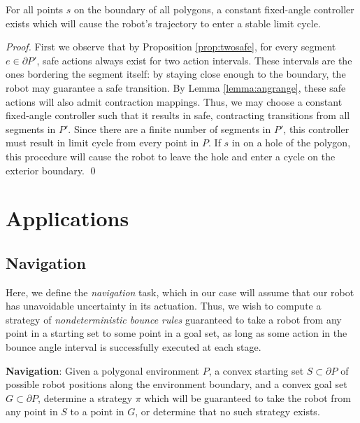 \documentclass[]{styles/svproc}  %
\begin{document}
\begin{proposition} \label{prop:cycle}
For all points $s$ on the boundary of all polygons, a constant
fixed-angle controller exists which will cause the robot's trajectory to enter a
stable limit cycle.
\end{proposition}

\begin{proof}
First we observe that by Proposition \ref{prop:twosafe}, for every segment $e
\in \partial P'$, 
safe actions always exist
for two action intervals. These intervals are the ones bordering the segment itself:
by staying close enough to the boundary, the robot may guarantee a safe
transition. By Lemma \ref{lemma:angrange}, these safe actions will also
admit contraction mappings. Thus, we may choose a constant fixed-angle
controller such that it results in safe, contracting transitions from all
segments in $P'$. Since there are a finite number of segments in $P'$, this
controller must result in limit cycle from every point in $P$. If $s$ in on a
hole of the polygon, this procedure will cause the robot to leave the hole and
enter a cycle on the exterior boundary. \qed
\end{proof}

\section{Applications}

\subsection{Navigation}

Here, we define the \emph{navigation} task, which in our case will assume that
our robot has unavoidable uncertainty in its actuation. Thus, we wish to compute 
a strategy of \emph{nondeterministic bounce rules} guaranteed to take a robot
from any point in a starting set to some point in a goal set, as long as some
action in the bounce angle interval is successfully executed at each stage. 

\begin{definition}
\textbf{Navigation}:
Given a polygonal environment $P$, a convex starting set $S \subset \partial P$ of possible robot positions along the
environment boundary, and a convex goal set $G \subset \partial P$, determine a strategy $\pi$ which
will be guaranteed to take the robot from any point in $S$ to a point in $G$, or
determine that no such strategy exists.
\end{definition}
\end{document}
